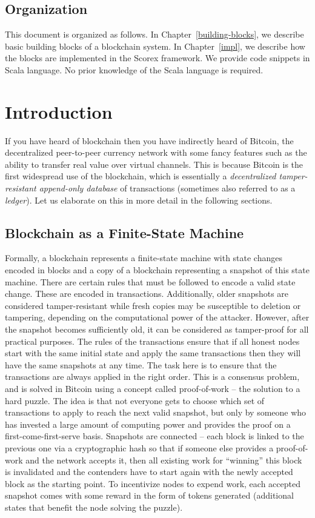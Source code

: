 \documentclass[]{report}   %
\begin{document}
\section{Organization}


This document is organized as follows. In Chapter~\ref{building-blocks}, we describe basic building blocks of a blockchain system. In Chapter~\ref{impl}, we describe how the blocks are implemented in the Scorex framework. We provide code snippets in Scala language. No prior knowledge of the Scala language is required.


\chapter{Introduction}

If you have heard of blockchain then you have indirectly heard of Bitcoin, the decentralized peer-to-peer currency network with some fancy features such as the ability to transfer real value over virtual channels. This is because Bitcoin is the first widespread use of the blockchain, which is essentially a {\em decentralized tamper-resistant append-only database} of transactions (sometimes also referred to as a {\em ledger}). Let us elaborate on this in more detail in the following sections. 

\section{Blockchain as a Finite-State Machine}
Formally, a blockchain represents a finite-state machine with state changes encoded in blocks and a copy of a blockchain representing a snapshot of this state machine. There are certain rules that must be followed to encode a valid state change. These are encoded in transactions. Additionally, older snapshots are considered tamper-resistant while fresh copies may be susceptible to deletion or tampering, depending on the computational power of the attacker. However, after the snapshot becomes sufficiently old, it can be considered as tamper-proof for all practical purposes. The rules of the transactions ensure that if all honest nodes start with the same initial state and apply the same transactions then they will have the same snapshots at any time. The task here is to ensure that the transactions are always applied in the right order. This is a consensus problem, and is solved in Bitcoin using a concept called proof-of-work -- the solution to a hard puzzle. The idea is that not everyone gets to choose which set of transactions to apply to reach the next valid snapshot, but only by someone who has invested a large amount of computing power and provides the proof on a first-come-first-serve basis. Snapshots are connected -- each block is linked to the previous one via a cryptographic hash so that if someone else provides a proof-of-work and the network accepts it, then all existing work for ``winning'' this block is invalidated and the contenders have to start again with the newly accepted block as the starting point. To incentivize nodes to expend work, each accepted snapshot comes with some reward in the form of tokens generated (additional states that benefit the node solving the puzzle). 
\end{document}
